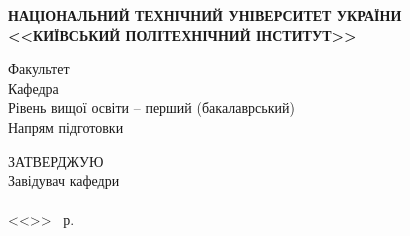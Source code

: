 \documentclass[main.tex]{subfiles}
\begin{document}

\newcommand\ufullline{\uline{\hfill\mbox{}}}

\begin{specialpage}
  \MakeUppercase{\textbf{національний технічний університет України}}\\
  \MakeUppercase{\textbf{<<Київський Політехнічний Інститут>>}}\\
  \begin{flushleft}
    Факультет \ufullline\\
    Кафедра \ufullline\\
    Рівень вищої освіти -- перший (бакалаврський)\\
    Напрям підготовки \uline{\hfill\mbox{}}
  \end{flushleft}

  \vspace{1cm}

  \hfill\begin{minipage}{0.35\linewidth}
  \begin{flushleft}
      ЗАТВЕРДЖУЮ\\
      Завідувач кафедри\\
      \fillin[(підпис)]{\hspace{2.2cm}} \\
      <<\fillin{\phantom{99}}>>\fillin{\hspace{3cm}} ~р.
  \end{flushleft}
  \end{minipage}

  \vspace{1cm}


\end{specialpage}
\end{document}
